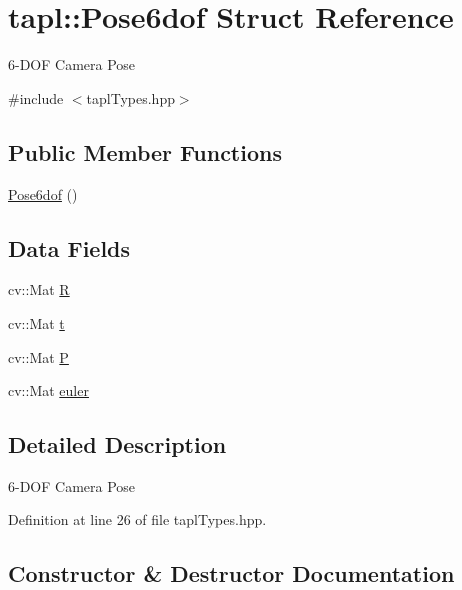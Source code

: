\hypertarget{structtapl_1_1Pose6dof}{}\section{tapl\+:\+:Pose6dof Struct Reference}
\label{structtapl_1_1Pose6dof}


6-\/\+D\+OF Camera Pose  




{\ttfamily \#include $<$tapl\+Types.\+hpp$>$}

\subsection*{Public Member Functions}
\begin{DoxyCompactItemize}
\item 
\hyperlink{structtapl_1_1Pose6dof_a48869500ca9d0fe0e2936132eaec566e}{Pose6dof} ()
\end{DoxyCompactItemize}
\subsection*{Data Fields}
\begin{DoxyCompactItemize}
\item 
cv\+::\+Mat \hyperlink{structtapl_1_1Pose6dof_a0ff2d0d3cb7c4d1cb83ffd8545dbbfa0}{R}
\item 
cv\+::\+Mat \hyperlink{structtapl_1_1Pose6dof_aaac0151b90bd28d462e400e5b5dbefcb}{t}
\item 
cv\+::\+Mat \hyperlink{structtapl_1_1Pose6dof_a2cc91e38bb0080f6e1760902613cc093}{P}
\item 
cv\+::\+Mat \hyperlink{structtapl_1_1Pose6dof_afa5dd6803d0f682139676e27ff20b9d2}{euler}
\end{DoxyCompactItemize}


\subsection{Detailed Description}
6-\/\+D\+OF Camera Pose 

Definition at line 26 of file tapl\+Types.\+hpp.



\subsection{Constructor \& Destructor Documentation}
